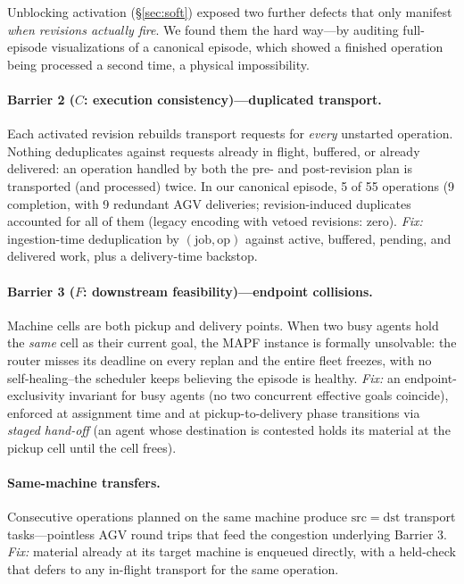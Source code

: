 \documentclass[twocolumn]{article}
\begin{document}
Unblocking activation (\S\ref{sec:soft}) exposed two further defects
that only manifest \emph{when revisions actually fire}. We found them
the hard way---by auditing full-episode visualizations of a canonical
episode, which showed a finished operation being processed a second
time, a physical impossibility.

\paragraph{Barrier 2 ($C$: execution consistency)---duplicated transport.}
Each activated revision rebuilds transport requests for \emph{every}
unstarted operation. Nothing deduplicates against requests already
in flight, buffered, or already delivered: an operation handled by both
the pre- and post-revision plan is transported (and processed) twice. In
our canonical episode, 5 of 55 operations (9\\%
completion, with 9 redundant AGV deliveries; revision-induced
duplicates accounted for all of them (legacy encoding with vetoed
revisions: zero). \emph{Fix:} ingestion-time deduplication by
$(\mathrm{job},\mathrm{op})$ against active, buffered, pending, and
delivered work, plus a delivery-time backstop.

\paragraph{Barrier 3 ($F$: downstream feasibility)---endpoint collisions.}
Machine cells are both pickup and delivery points. When two busy agents
hold the \emph{same} cell as their current goal, the MAPF instance is
formally unsolvable: the router misses its deadline on every replan and
the entire fleet freezes, with no self-healing\---the scheduler
keeps believing the episode is healthy. \emph{Fix:} an
endpoint-exclusivity invariant for busy agents (no two concurrent
effective goals coincide), enforced at assignment time and at
pickup-to-delivery phase transitions via \emph{staged hand-off} (an
agent whose destination is contested holds its material at the pickup
cell until the cell frees).

\paragraph{Same-machine transfers.}
Consecutive operations planned on the same machine produce $\mathrm{src}
= \mathrm{dst}$ transport tasks---pointless AGV round trips that feed
the congestion underlying Barrier 3. \emph{Fix:} material already at
its target machine is enqueued directly, with a held-check that defers
to any in-flight transport for the same operation.
\end{document}
